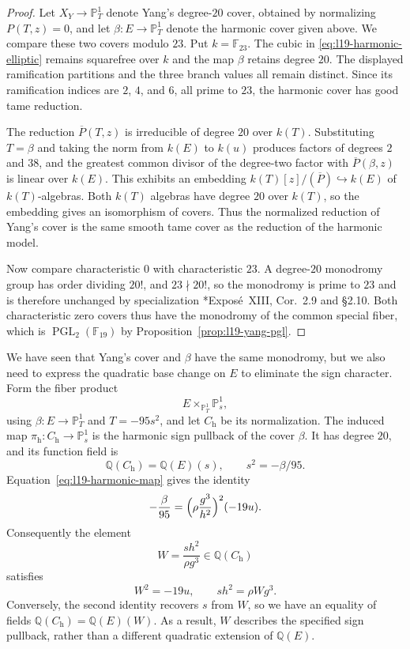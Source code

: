 \documentclass[10pt]{amsart}
\numberwithin{equation}{section}
\theoremstyle{definition}
\theoremstyle{remark}
\newcommand{\PP}{\mathbb P}
\newcommand{\F}{\mathbb{F}}
\newcommand{\Q}{\mathbb{Q}}
\newcommand{\PGL}{\operatorname{PGL}}
\begin{document}
\begin{proof}
Let $X_Y\to\PP^1_T$ denote Yang's degree-$20$ cover, obtained by normalizing
$P(T,z)=0$, and let $\beta\colon E\to\PP^1_T$ denote the harmonic cover given above.
We compare these two covers modulo $23$.  Put $k=\F_{23}$.  The cubic in
\eqref{eq:l19-harmonic-elliptic} remains squarefree over $k$ and the map
$\beta$ retains degree $20$. The displayed ramification partitions and
the three branch values all remain distinct.  Since its ramification indices
are $2$, $4$, and $6$, all prime to $23$, the harmonic cover has good tame
reduction.

The reduction $\overline P(T,z)$ is irreducible of degree $20$ over $k(T)$.
Substituting $T=\beta$ and taking the norm
from $k(E)$ to $k(u)$ produces factors of degrees
$2$ and $38$,
and the greatest common divisor of the degree-two factor with
$\overline P(\beta,z)$ is
linear over $k(E)$.  This exhibits an embedding
$k(T)[z]/(\overline P)\hookrightarrow k(E)$ of $k(T)$-algebras. Both $k(T)$ algebras have degree
$20$ over $k(T)$, so the embedding gives an isomorphism of covers.
Thus the normalized reduction of Yang's cover is the same smooth tame cover
as the reduction of the harmonic model.



Now compare characteristic $0$ with characteristic $23$. A degree-$20$
monodromy group has order dividing $20!$, and $23\nmid20!$, so the monodromy
is prime to $23$ and is therefore unchanged by specialization
\cite{SGA1}*{Expos\'e~XIII, Cor.~2.9 and \S2.10}. Both characteristic zero
covers thus have the monodromy of the common special fiber, which is
$\PGL_2(\F_{19})$ by Proposition~\ref{prop:l19-yang-pgl}.
\end{proof}

We have seen that Yang's cover and $\beta$ have the same monodromy, but we also need to express the quadratic base change on $E$ to eliminate the sign character. Form the fiber product
\[
 E\times_{\PP^1_T}\PP^1_s,
\]
using $\beta\colon E\to\PP^1_T$ and $T=-95s^2$, and let $C_{\mathrm h}$
be its normalization. The induced map
$\pi_{\mathrm h}\colon C_{\mathrm h}\to\PP^1_s$ is the harmonic sign
pullback of the cover $\beta$. It has degree $20$, and its function field is
\[
 \Q(C_{\mathrm h})=\Q(E)(s),\qquad s^2=-\beta/95.
\]
Equation~\eqref{eq:l19-harmonic-map} gives the identity
\[
 -\frac{\beta}{95}
   =\Bigl(\rho\frac{g^3}{h^2}\Bigr)^2(-19u).
\]
Consequently the element
\[
 W=\frac{s h^2}{\rho g^3}\in\Q(C_{\mathrm h})
\]
satisfies
\[
 W^2=-19u,
 \qquad
 s h^2=\rho Wg^3.
\]
Conversely, the second identity recovers $s$ from $W$, so we have an equality of fields
$\Q(C_{\mathrm h})=\Q(E)(W)$. As a result, $W$ describes the specified sign pullback, rather than a different quadratic extension of $\Q(E)$.
\end{document}
